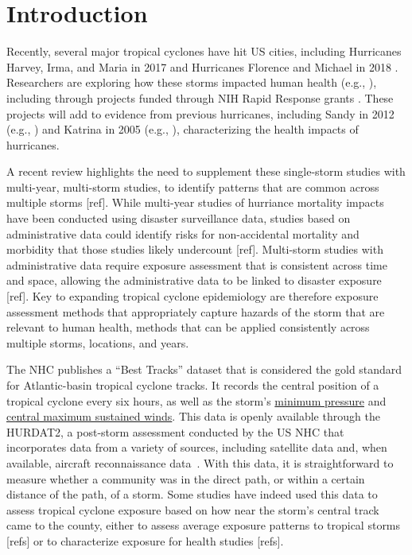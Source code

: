 \section*{Introduction}

\acresetall

Recently, several major tropical cyclones have hit \ac{US} cities, including
Hurricanes Harvey, Irma, and Maria in 2017 \parencite{blake20182017} and
Hurricanes Florence and Michael in 2018 \parencite{avila20192018}. Researchers
are exploring how these storms impacted human health (e.g.,
\parencite{santos2018use, rivera2018estimating, santos2018differential,
grineski2019impact, issa2018deaths, tanz2019notes, paul2019brief}), including
through projects funded through \ac{NIH} Rapid Response grants
\parencite{nihreporter}. These projects will add to evidence from previous
hurricanes, including Sandy in 2012 (e.g., \parencite{swerdel2014}) and Katrina
in 2005 (e.g., \parencite{burton2009health}), characterizing the health impacts
of hurricanes. 

A recent review highlights the need to supplement these single-storm studies
with multi-year, multi-storm studies, to identify patterns that are common
across multiple storms [ref]. While multi-year studies of hurriance mortality
impacts have been conducted using disaster surveillance data, studies based on
administrative data could identify risks for non-accidental mortality and
morbidity that those studies likely undercount [ref]. Multi-storm studies with
administrative data require exposure assessment that is consistent across time
and space, allowing the administrative data to be linked to disaster exposure
[ref]. Key to expanding tropical cyclone epidemiology are therefore exposure
assessment methods that appropriately capture hazards of the storm that are
relevant to human health, methods that can be applied consistently across
multiple storms, locations, and years. 

The \ac{NHC} publishes a ``Best Tracks'' dataset that is considered the gold
standard for Atlantic-basin tropical cyclone tracks.  It records the central
position of a tropical cyclone every six hours, as well as the storm's
\underline{minimum pressure} and \underline{central maximum sustained winds}. This data is openly
available through the \ac{HURDAT2}, a post-storm assessment conducted
by the \ac{US} \ac{NHC} that incorporates data from a variety of sources,
including satellite data and, when available, aircraft reconnaissance
data~\parencite{landsea2013, jarvinen1988}. With this data, it is
straightforward to measure whether a community was in the direct path, or
within a certain distance of the path, of a storm. Some studies have indeed
used this data to assess tropical cyclone exposure based on how near the
storm's central track came to the county, either to assess average exposure
patterns to tropical storms [refs] or to characterize exposure for health
studies [refs].

